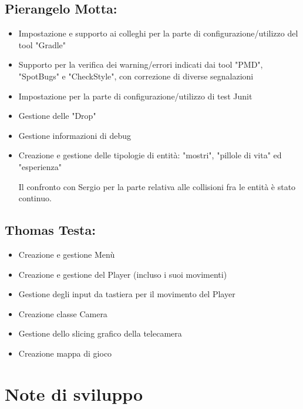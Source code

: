 \documentclass[a4paper,12pt]{report}
\begin{document}
\paragraph{}

\subsection*{Pierangelo Motta:}
\begin{itemize}
	\item Impostazione e supporto ai colleghi per la parte di configurazione/utilizzo del tool "Gradle"
	\item Supporto per la verifica dei warning/errori indicati dai tool "PMD", "SpotBugs" e "CheckStyle", con correzione di diverse segnalazioni 
	\item Impostazione per la parte di configurazione/utilizzo di test Junit
	\item Gestione delle "Drop"
	\item Gestione informazioni di debug
	\item Creazione e gestione delle tipologie di entità: "mostri", "pillole di vita" ed "esperienza"
	
	Il confronto con Sergio per la parte relativa alle collisioni fra le entità è stato continuo.
\end{itemize}
\subsection*{Thomas Testa:}
\begin{itemize}
	\item Creazione e gestione Menù 
    \item Creazione e gestione del Player (incluso i suoi movimenti)
	\item Gestione degli input da tastiera per il movimento del Player 
    \item Creazione classe Camera
    \item Gestione dello slicing grafico della telecamera
    \item Creazione mappa di gioco
\end{itemize}

\paragraph{}


\section{Note di sviluppo}
\end{document}
